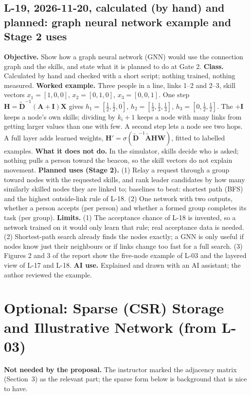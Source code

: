 \IfFileExists{IEEEtran.cls}{\documentclass[conference]{IEEEtran}}{\documentclass[10pt,twocolumn]{article}}
\begin{document}
\subsection*{L-19, 2026-11-20, calculated (by hand) and planned: graph neural network example and Stage 2 uses}
\textbf{Objective.} Show how a graph neural network (GNN) would use the connection graph and the skills, and state what it is planned to do at Gate 2. \textbf{Class.} Calculated by hand and checked with a short script; nothing trained, nothing measured. \textbf{Worked example.} Three people in a line, links 1--2 and 2--3, skill vectors $x_1=[1,0,0]$, $x_2=[0,1,0]$, $x_3=[0,0,1]$. One step $\mathbf H=\tilde{\mathbf D}^{-1}(\mathbf A+\mathbf I)\mathbf X$ gives $h_1=[\tfrac12,\tfrac12,0]$, $h_2=[\tfrac13,\tfrac13,\tfrac13]$, $h_3=[0,\tfrac12,\tfrac12]$. The $+\mathbf I$ keeps a node's own skills; dividing by $k_i+1$ keeps a node with many links from getting larger values than one with few. A second step lets a node see two hops. A full layer adds learned weights, $\mathbf H'=\sigma(\tilde{\mathbf D}^{-1}\tilde{\mathbf A}\mathbf H\mathbf W)$, fitted to labelled examples. \textbf{What it does not do.} In the simulator, skills decide who is asked; nothing pulls a person toward the beacon, so the skill vectors do not explain movement. \textbf{Planned uses (Stage 2).} (1) Relay a request through a group toward nodes with the requested skills, and rank leader candidates by how many similarly skilled nodes they are linked to; baselines to beat: shortest path (BFS) and the highest outside-link rule of L-18. (2) One network with two outputs, whether a person accepts (per person) and whether a formed group completes its task (per group). \textbf{Limits.} (1) The acceptance chance of L-18 is invented, so a network trained on it would only learn that rule; real acceptance data is needed. (2) Shortest-path search already finds the nodes exactly; a GNN is only useful if nodes know just their neighbours or if links change too fast for a full search. (3) Figures 2 and 3 of the report show the five-node example of L-03 and the layered view of L-17 and L-18. \textbf{AI use.} Explained and drawn with an AI assistant; the author reviewed the example.

\section{Optional: Sparse (CSR) Storage and Illustrative Network (from L-03)}
\textbf{Not needed by the proposal.} The instructor marked the adjacency matrix (Section~3) as the relevant part; the sparse form below is background that is nice to have.
\end{document}
